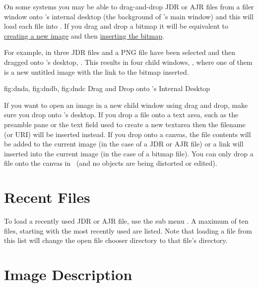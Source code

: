 On some systems you may be able to \gls{drag-and-drop} \gls{JDR} or
\gls{AJR} files from a filer window onto \FlowframTk's internal desktop
(the  background of \FlowframTk's main window) and this
will load each file into \FlowframTk. If you drag and drop a
\gls{bitmap} it will be equivalent to \hyperref[sec:newimage]{creating a
new image} and then \hyperref[sec:insertbitmap]{inserting the bitmap}.

For example, in  three \gls{JDR} files and
a PNG file have been selected and then dragged onto \FlowframTk's
desktop, . This results in four child
windows, , where one of them is a new
untitled image with the link to the \gls{bitmap} inserted.

{
  {fig:dnda}{}{},
  {fig:dndb}{}{},
  {fig:dndc}{}{}
}
{Drag and Drop onto \FlowframTk's Internal Desktop}

If you want to open an image in a new child window using drag and drop,
make sure you drop onto \FlowframTk's desktop. If you drop a file onto a
text area, such as the preamble pane or the text field used to
create a new \gls{textarea} then the filename (or URI) will be
inserted instead. If you drop onto a \gls{canvas}, the file contents
will be added to the current image (in the case of a \gls{JDR} or
\gls{AJR} file) or a link will inserted into the current image (in the
case of a \gls{bitmap} file). You can only drop a file onto the
\gls{canvas} in \selectmode\ (and no objects are being distorted or
edited).

\section{Recent Files}\label{sec:recentfiles}


To load a recently used \gls{JDR} or \gls{AJR} file, use the sub
menu . A maximum of ten files, starting with the
most recently used are listed. Note that loading a file from this
list will change the open file chooser directory to that file's
directory.

\section{Image Description}\label{sec:imagedescription}


